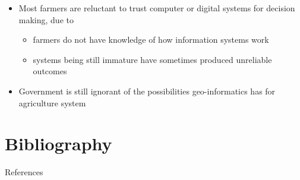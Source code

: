 \documentclass[11pt,dvipsnames,ignorenonframetext,aspectratio=169]{beamer}
\providecommand{\tightlist}{%
  \setlength{\itemsep}{0pt}\setlength{\parskip}{0pt}}
\begin{document}
\begin{frame}{}
\protect\hypertarget{section-10}{}
\begin{itemize}
\tightlist
\item
  Most farmers are reluctant to trust computer or digital systems for
  decision making, due to

  \begin{itemize}
  \tightlist
  \item
    farmers do not have knowledge of how information systems work
  \item
    systems being still immature have sometimes produced unreliable
    outcomes
  \end{itemize}
\item
  Government is still ignorant of the possibilities geo-informatics has
  for agriculture system
\end{itemize}
\end{frame}

\hypertarget{bibliography}{%
\section{Bibliography}\label{bibliography}}

\begin{frame}{References}
\protect\hypertarget{references}{}
\end{frame}
\end{document}

